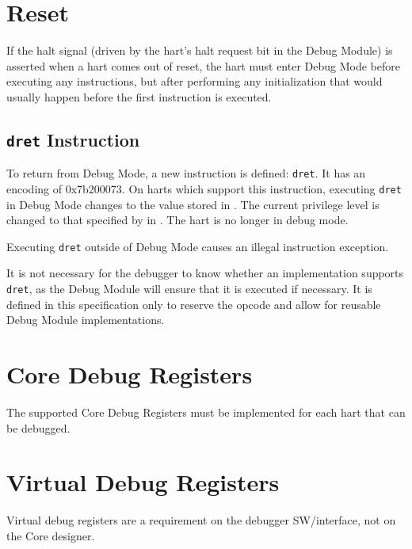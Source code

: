 \section{Reset}

If the halt signal (driven by the hart's halt request bit in the Debug Module)
is asserted when a hart comes out of reset, the hart must
enter Debug Mode before executing any instructions, but after performing any
initialization that would usually happen before the first instruction is
executed.

\subsection{{\tt dret} Instruction} \label{dret}

To return from Debug Mode, a new instruction is defined: {\tt dret}. It has an
encoding of 0x7b200073. On harts which support this instruction,
executing {\tt dret} in Debug Mode changes \Rpc to the value
stored in \Rdpc. The current privilege level is changed to that specified by
\Fprv in \Rdcsr. The hart is no longer in debug mode.

Executing {\tt dret} outside of Debug Mode causes an illegal instruction exception.

It is not necessary for the debugger to know whether an implementation supports
{\tt dret}, as the Debug Module will ensure that it is executed if necessary.
It is defined in this specification only to reserve the opcode and
allow for reusable Debug Module implementations.

\section{Core Debug Registers} \label{debreg}

The supported Core Debug Registers must be implemented for each hart that can
be debugged.



\section{Virtual Debug Registers} \label{virtreg}

Virtual debug registers are a requirement on the debugger SW/interface,
not on the Core designer.


